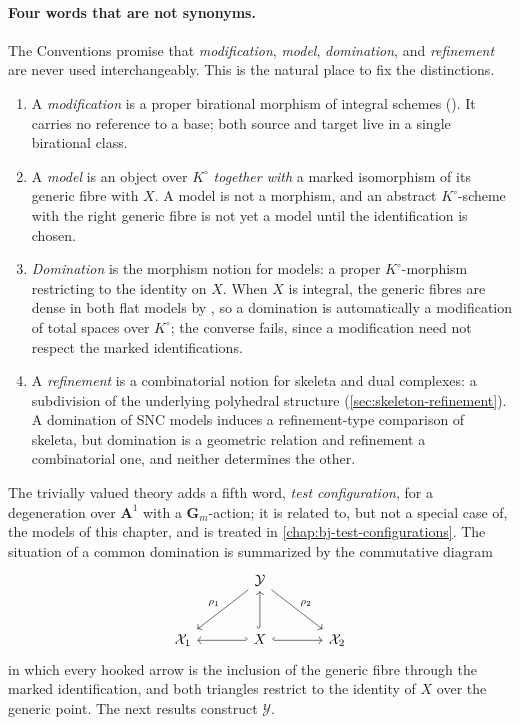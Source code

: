 \paragraph{Four words that are not synonyms.}
The Conventions promise that \emph{modification}, \emph{model},
\emph{domination}, and \emph{refinement} are never used interchangeably.
This is the natural place to fix the distinctions.
\begin{enumerate}
\item A \emph{modification} is a proper birational morphism of integral
  schemes ().  It carries no reference to a
  base; both source and target live in a single birational class.
\item A \emph{model} is an object over $K^\circ$ \emph{together with} a
  marked isomorphism of its generic fibre with $X$.  A model is not a
  morphism, and an abstract $K^\circ$-scheme with the right generic fibre
  is not yet a model until the identification is chosen.
\item \emph{Domination} is the morphism notion for models: a proper
  $K^\circ$-morphism restricting to the identity on $X$.  When $X$ is
  integral, the generic fibres are dense in both flat models by
  , so a domination is automatically a
  modification of total spaces over $K^\circ$; the converse fails, since a
  modification need not respect the marked identifications.
\item A \emph{refinement} is a combinatorial notion for skeleta and dual
  complexes: a subdivision of the underlying polyhedral structure
  (\cref{sec:skeleton-refinement}).  A domination of SNC models induces a
  refinement-type comparison of skeleta, but domination is a geometric
  relation and refinement a combinatorial one, and neither determines the
  other.
\end{enumerate}
The trivially valued theory adds a fifth word, \emph{test configuration},
for a degeneration over $\mathbf A^1$ with a $\mathbf G_m$-action; it is
related to, but not a special case of, the models of this chapter, and is
treated in \cref{chap:bj-test-configurations}.  The situation of a common
domination is summarized by the commutative diagram
\[
\begin{tikzcd}[column sep=large,row sep=large]
 & \mathcal Y \arrow[dl,"\rho_1"'] \arrow[dr,"\rho_2"] & \\
\mathcal X_1 & X \arrow[l,hook'] \arrow[u,hook] \arrow[r,hook]
 & \mathcal X_2
\end{tikzcd}
\]
in which every hooked arrow is the inclusion of the generic fibre through
the marked identification, and both triangles restrict to the identity of
$X$ over the generic point.  The next results construct $\mathcal Y$.

